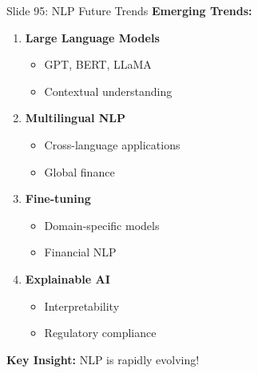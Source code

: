 \documentclass[8pt]{beamer}
\begin{document}
	\begin{frame}{Slide 95: NLP Future Trends}
		\fontsize{6.5}{7.5}\selectfont
		\textbf{Emerging Trends:}
		\begin{enumerate}
			\item \textbf{Large Language Models}
			\begin{itemize}
				\item GPT, BERT, LLaMA
				\item Contextual understanding
			\end{itemize}
			\item \textbf{Multilingual NLP}
			\begin{itemize}
				\item Cross-language applications
				\item Global finance
			\end{itemize}
			\item \textbf{Fine-tuning}
			\begin{itemize}
				\item Domain-specific models
				\item Financial NLP
			\end{itemize}
			\item \textbf{Explainable AI}
			\begin{itemize}
				\item Interpretability
				\item Regulatory compliance
			\end{itemize}
		\end{enumerate}
		
		\textcolor{myblue}{\textbf{Key Insight:}} NLP is rapidly evolving!
	\end{frame}
	
\end{document}
